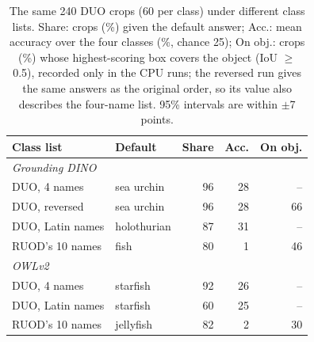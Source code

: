 \begin{table}[t]
\centering
\small
\setlength{\tabcolsep}{4pt}
\begin{tabular}{llrrr}
\toprule
Class list & Default & Share & Acc. & On obj. \\
\midrule
\multicolumn{5}{l}{\emph{Grounding DINO}} \\
DUO, 4 names & sea urchin & 96 & 28 & -- \\
DUO, reversed & sea urchin & 96 & 28 & 66 \\
DUO, Latin names & holothurian & 87 & 31 & -- \\
RUOD's 10 names & fish & 80 & 1 & 46 \\
\midrule
\multicolumn{5}{l}{\emph{OWLv2}} \\
DUO, 4 names & starfish & 92 & 26 & -- \\
DUO, Latin names & starfish & 60 & 25 & -- \\
RUOD's 10 names & jellyfish & 82 & 2 & 30 \\
\bottomrule
\end{tabular}
\caption{The same 240 DUO crops (60 per class) under different class lists. Share: crops (\%) given the default answer; Acc.: mean accuracy over the four classes (\%, chance 25); On obj.: crops (\%) whose highest-scoring box covers the object (IoU $\geq$ 0.5), recorded only in the CPU runs; the reversed run gives the same answers as the original order, so its value also describes the four-name list. 95\% intervals are within $\pm$7 points.}
\label{tab:vocab}
\end{table}
